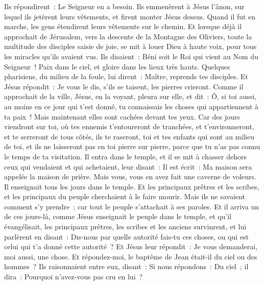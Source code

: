 \begin{multicols}{2}
Ils répondirent~: Le Seigneur en a besoin.
Ils emmenèrent à Jésus l'ânon, sur lequel ils jetèrent leurs vêtements, et firent monter Jésus dessus.
Quand il fut en marche, les gens étendirent leurs vêtements sur le chemin.
Et lorsque déjà il approchait de Jérusalem, vers la descente de la Montagne des Oliviers, toute la multitude des disciples saisie de joie, se mit à louer Dieu à haute voix, pour tous les miracles qu'ils avaient vus.
Ils disaient~: Béni soit le Roi qui vient au Nom du Seigneur~! Paix dans le ciel, et gloire dans les lieux très hauts.
Quelques pharisiens, du milieu de la foule, lui dirent~: Maître, reprends tes disciples.
Et Jésus répondit~: Je vous le dis, s'ils se taisent, les pierres crieront.
Comme il approchait de la ville, Jésus, en la voyant, pleura sur elle, et dit~:
Ô, si toi aussi, au moins en ce jour qui t'est donné, tu connaissais les choses qui appartiennent à ta paix~! Mais maintenant elles sont cachées devant tes yeux.
Car des jours viendront sur toi, où tes ennemis t'entoureront de tranchées, et t'environneront, et te serreront de tous côtés,
ils te raseront, toi et tes enfants qui sont au milieu de toi, et ils ne laisseront pas en toi pierre sur pierre, parce que tu n'as pas connu le temps de ta visitation.
Il entra dans le temple, et il se mit à chasser dehors ceux qui vendaient et qui achetaient,
leur disant~: Il est écrit~: Ma maison sera appelée la maison de prière. Mais vous, vous en avez fait une caverne de voleurs.
Il enseignait tous les jours dans le temple. Et les principaux prêtres et les scribes, et les principaux du peuple cherchaient à le faire mourir.
Mais ils ne savaient comment s'y prendre~; car tout le peuple s'attachait à ses paroles.
\VerseOne{}Et il arriva un de ces jours-là, comme Jésus enseignait le peuple dans le temple, et qu'il évangélisait, les principaux prêtres, les scribes et les anciens survinrent,
et lui parlèrent en disant~: Dis-nous par quelle autorité fais-tu ces choses, ou qui est celui qui t'a donné cette autorité~?
Et Jésus leur répondit~: Je vous demanderai, moi aussi, une chose. Et répondez-moi,
le baptême de Jean était-il du ciel ou des hommes~?
Ils raisonnaient entre eux, disant~: Si nous répondons~: Du ciel~; il dira~: Pourquoi n'avez-vous pas cru en lui~?

\end{multicols}
